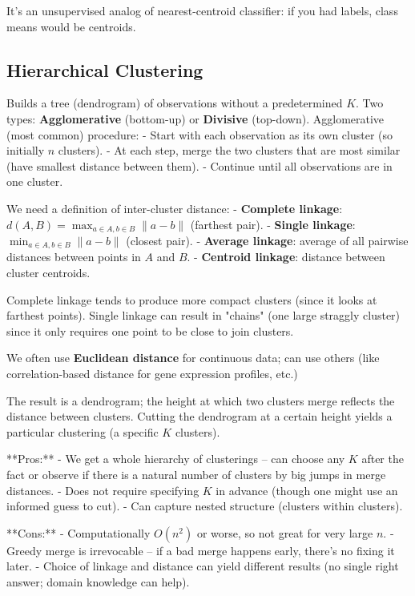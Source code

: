 \documentclass[11pt]{article}
\begin{document}
It’s an unsupervised analog of nearest-centroid classifier: if you had labels, class means would be centroids.

\subsection{Hierarchical Clustering}
Builds a tree (dendrogram) of observations without a predetermined $K$. Two types: \textbf{Agglomerative} (bottom-up) or \textbf{Divisive} (top-down).
Agglomerative (most common) procedure:
- Start with each observation as its own cluster (so initially $n$ clusters).
- At each step, merge the two clusters that are most similar (have smallest distance between them).
- Continue until all observations are in one cluster.

We need a definition of inter-cluster distance:
- \textbf{Complete linkage}: $d(A,B) = \max_{a \in A, b \in B} \|a-b\|$ (farthest pair).
- \textbf{Single linkage}: $\min_{a \in A, b \in B} \|a-b\|$ (closest pair).
- \textbf{Average linkage}: average of all pairwise distances between points in $A$ and $B$.
- \textbf{Centroid linkage}: distance between cluster centroids.

Complete linkage tends to produce more compact clusters (since it looks at farthest points). Single linkage can result in "chains" (one large straggly cluster) since it only requires one point to be close to join clusters.

We often use \textbf{Euclidean distance} for continuous data; can use others (like correlation-based distance for gene expression profiles, etc.)

The result is a dendrogram; the height at which two clusters merge reflects the distance between clusters. Cutting the dendrogram at a certain height yields a particular clustering (a specific $K$ clusters).

**Pros:**
- We get a whole hierarchy of clusterings – can choose any $K$ after the fact or observe if there is a natural number of clusters by big jumps in merge distances.
- Does not require specifying $K$ in advance (though one might use an informed guess to cut).
- Can capture nested structure (clusters within clusters).

**Cons:**
- Computationally $O(n^2)$ or worse, so not great for very large $n$.
- Greedy merge is irrevocable – if a bad merge happens early, there's no fixing it later.
- Choice of linkage and distance can yield different results (no single right answer; domain knowledge can help).
\end{document}

